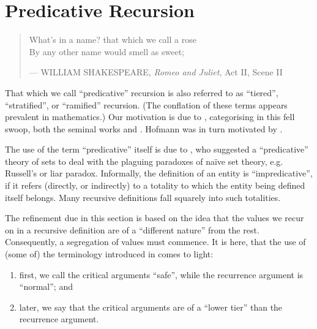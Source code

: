 \chapter{Predicative Recursion}

\begin{quotation}

\footnotesize\sffamily\itshape

\begin{flushright}

What's in a name? that which we call a rose \\
By any other name would smell as sweet;

\smallbreak

\upshape

--- WILLIAM SHAKESPEARE, \emph{Romeo and Juliet}, Act II, Scene II

\end{flushright}

\end{quotation}

That which we call ``predicative'' recursion is also referred to as
``tiered''\cite{leivant-1990}, ``stratified''\cite{leivant-1993}, or
``ramified''\cite{leivant-1995} recursion. (The conflation of these terms
appears prevalent in mathematics.) Our motivation is due to
\cite{hofmann-2000a}, categorising in this fell swoop, both the seminal works
\cite{bellantoni-cook-1992} and \cite{leivant-1995}. Hofmann was in turn
motivated by \cite{bellantoni-phd-1992}.

The use of the term ``predicative'' itself is due to \cite{russell-1907}, who
suggested a ``predicative'' theory of sets to deal with the plaguing paradoxes
of na\"ive set theory, e.g. Russell's or liar paradox. Informally, the
definition of an entity is ``impredicative''\cite{goedel-1944}, if it refers
(directly, or indirectly) to a totality to which the entity being defined
itself belongs.  Many recursive definitions fall squarely into such totalities. 

The refinement due in this section is based on the idea that the values we
recur on in a recursive definition are of a ``different nature'' from the
rest\cite{caseiro-1996}. Consequently, a segregation of values must commence.
It is here, that the use of (some of) the terminology introduced in
 comes to light:

\begin{enumerate}[label=(\arabic*)]

\item first, we call the critical arguments ``safe'', while the recurrence
argument is ``normal''; and

\item later, we say that the critical arguments are of a ``lower tier'' than
the recurrence argument.

\end{enumerate}


